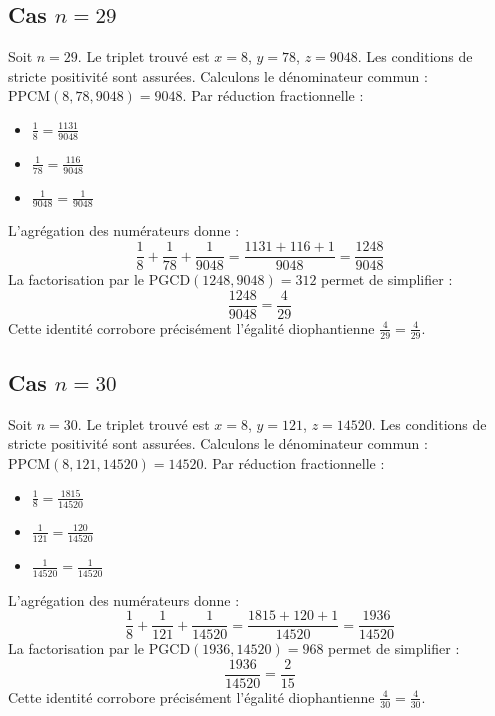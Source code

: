 \documentclass[11pt,a4paper]{article}
\begin{document}
\subsection{Cas $n = 29$}
Soit $n = 29$. Le triplet trouvé est $x = 8$, $y = 78$, $z = 9048$.
Les conditions de stricte positivité sont assurées.
Calculons le dénominateur commun : $\text{PPCM}(8, 78, 9048) = 9048$.
Par réduction fractionnelle :
\begin{itemize}
    \item $\frac{1}{8} = \frac{1131}{9048}$
    \item $\frac{1}{78} = \frac{116}{9048}$
    \item $\frac{1}{9048} = \frac{1}{9048}$
\end{itemize}
L'agrégation des numérateurs donne :
$$ \frac{1}{8} + \frac{1}{78} + \frac{1}{9048} = \frac{1131 + 116 + 1}{9048} = \frac{1248}{9048} $$
La factorisation par le $\text{PGCD}(1248, 9048) = 312$ permet de simplifier :
$$ \frac{1248}{9048} = \frac{4}{29} $$
Cette identité corrobore précisément l'égalité diophantienne $\frac{4}{29} = \frac{4}{29}$.

\subsection{Cas $n = 30$}
Soit $n = 30$. Le triplet trouvé est $x = 8$, $y = 121$, $z = 14520$.
Les conditions de stricte positivité sont assurées.
Calculons le dénominateur commun : $\text{PPCM}(8, 121, 14520) = 14520$.
Par réduction fractionnelle :
\begin{itemize}
    \item $\frac{1}{8} = \frac{1815}{14520}$
    \item $\frac{1}{121} = \frac{120}{14520}$
    \item $\frac{1}{14520} = \frac{1}{14520}$
\end{itemize}
L'agrégation des numérateurs donne :
$$ \frac{1}{8} + \frac{1}{121} + \frac{1}{14520} = \frac{1815 + 120 + 1}{14520} = \frac{1936}{14520} $$
La factorisation par le $\text{PGCD}(1936, 14520) = 968$ permet de simplifier :
$$ \frac{1936}{14520} = \frac{2}{15} $$
Cette identité corrobore précisément l'égalité diophantienne $\frac{4}{30} = \frac{4}{30}$.
\end{document}
